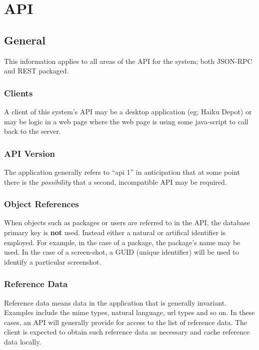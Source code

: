 
\section{API}

\subsection{General}

This information applies to all areas of the API for the system; both JSON-RPC and REST packaged.

\subsubsection{Clients}

A client of this system's API may be a desktop application (eg; Haiku Depot) or may be logic in a web page where the web page is using some java-script to call back to the server.

\subsubsection{API Version}

The application generally refers to ``api 1'' in anticipation that at some point there is the {\it possibility} that a second, incompatible API may be required.

\subsubsection{Object References}

When objects such as packages or users are referred to in the API, the database primary key is {\bf not} used.  Instead either a natural or artifical identifier is employed.  For example, in the case of a package, the package's name may be used.  In the case of a screen-shot, a GUID (unique identifier) will be used to identify a particular screenshot.

\subsubsection{Reference Data}

Reference data means data in the application that is generally invariant.  Examples include the mime types, natural language, url types and so on.  In these cases, an API will generally provide for access to the list of reference data.  The client is expected to obtain such reference data as necessary and cache reference data locally.

